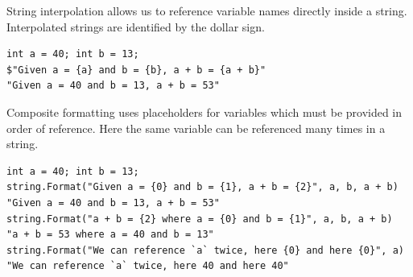 \documentclass{article}
\def\customlinemarker#1#2{
    \edef\thelstnumber{%
        \unexpanded{%
            \ifnum#1=\value{lstnumber}\relax
              #2%
            \fi}%
        \ifx\thelstnumber\relax\else
        \expandafter\unexpanded\expandafter{\thelstnumber}%
        \fi
    }
}
\begin{document}
String interpolation allows us to reference variable names directly inside a string.
Interpolated strings are identified by the dollar sign.
\begingroup
\let\thelstnumber\relax
\customlinemarker{1}{\$}
\customlinemarker{2}{\$}
\begin{lstlisting}
int a = 40; int b = 13;
$"Given a = {a} and b = {b}, a + b = {a + b}"
"Given a = 40 and b = 13, a + b = 53"
\end{lstlisting}
\endgroup
Composite formatting uses placeholders for variables which must be provided in order of reference.
Here the same variable can be referenced many times in a string.
\begingroup
\let\thelstnumber\relax
\customlinemarker{1}{\$}
\customlinemarker{2}{\$}
\customlinemarker{4}{\$}
\customlinemarker{6}{\$}
\begin{lstlisting}
int a = 40; int b = 13;
string.Format("Given a = {0} and b = {1}, a + b = {2}", a, b, a + b)
"Given a = 40 and b = 13, a + b = 53"
string.Format("a + b = {2} where a = {0} and b = {1}", a, b, a + b)
"a + b = 53 where a = 40 and b = 13"
string.Format("We can reference `a` twice, here {0} and here {0}", a)
"We can reference `a` twice, here 40 and here 40"
\end{lstlisting}
\endgroup
\end{document}
